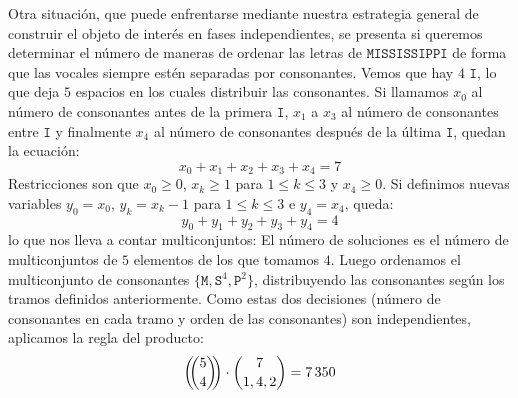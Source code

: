   Otra situación,
  que puede enfrentarse mediante nuestra estrategia general
  de construir el objeto de interés
  en fases independientes,%
  se presenta si queremos determinar
  el número de maneras de ordenar las letras de \(\mathtt{MISSISSIPPI}\)
  de forma que las vocales siempre estén separadas por consonantes.
  Vemos que hay \(4\) \(\mathtt{I}\),
  lo que deja \(5\) espacios en los cuales distribuir las consonantes.
  Si llamamos \(x_0\) al número de consonantes
  antes de la primera \(\mathtt{I}\),
  \(x_1\) a \(x_3\) al número de consonantes entre \(\mathtt{I}\)
  y finalmente \(x_4\) al número de consonantes
  después de la última \(\mathtt{I}\),
  quedan la ecuación:
  \begin{equation*}
    x_0 + x_1 + x_2 + x_3 + x_4
      = 7
  \end{equation*}
  Restricciones son que \(x_0 \ge 0\),
  \(x_k \ge 1\) para \(1 \le k \le 3\)
  y \(x_4 \ge 0\).
  Si definimos nuevas variables \(y_0 = x_0\),
  \(y_k = x_k - 1\) para \(1 \le k \le 3\)
  e \(y_4 = x_4\),
  queda:
  \begin{equation*}
    y_0 + y_1 + y_2 + y_3 + y_4
      = 4
  \end{equation*}
  lo que nos lleva a contar multiconjuntos:%
  El número de soluciones es el número de multiconjuntos
  de \(5\) elementos de los que tomamos \(4\).
  Luego ordenamos el multiconjunto de consonantes
  \(\{\mathtt{M}, \mathtt{S}^4, \mathtt{P}^2\}\),
  distribuyendo las consonantes según los tramos definidos anteriormente.
  Como estas dos decisiones
  (número de consonantes en cada tramo
   y orden de las consonantes)
  son independientes,
  aplicamos la regla del producto:
  \begin{equation*}
    \left( \!\! \binom{5}{4} \!\! \right) \cdot \binom{7}{1, 4, 2}
      = 7\,350
  \end{equation*}


